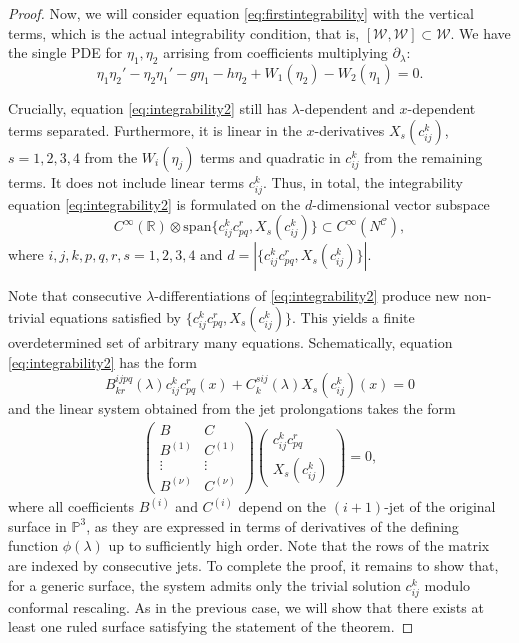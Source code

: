 \documentclass[11pt]{amsart}
\theoremstyle{definition}
\newcommand{\R}{\mathbb{R}}
\newcommand{\PP}{\mathbb{P}}
\newcommand{\spn}{\mathrm{span}}
\newcommand{\WW}{\mathcal{W}}
\begin{document}
\begin{proof}
Now, we will consider equation \eqref{eq:firstintegrability} with the vertical terms, which is the actual integrability condition, that is, $[\WW,\WW]\subset \WW$. We have the single PDE for $\eta_1,\eta_2$ arrising from coefficients multiplying $\partial_\lambda$:
\begin{equation}\label{eq:integrability2}
\eta_1\eta_2'-\eta_2\eta_1'-g\eta_1-h\eta_2+W_1(\eta_2)-W_2(\eta_1)=0.
\end{equation}

Crucially, equation \eqref{eq:integrability2} still has $\lambda$-dependent and $x$-dependent terms separated. Furthermore, it is linear in the $x$-derivatives $X_s(c^k_{ij})$, $s=1,2,3,4$ from the $W_i(\eta_j)$ terms and quadratic in $c^k_{ij}$ from the remaining terms. It does not include linear terms $c^k_{ij}$.  Thus, in total, the integrability equation \eqref{eq:integrability2} is formulated on the $d$-dimensional vector subspace
\[
C^\infty(\R)\otimes\spn\{c^k_{ij}c^r_{pq}, X_s(c^k_{ij})\}\subset C^\infty(N^\mathcal{C}),
\]
where $i,j,k,p,q,r,s=1,2,3,4$ and $d=|\{c^k_{ij}c^r_{pq}, X_s(c^k_{ij})\}|$.

Note that consecutive $\lambda$-differentiations of \eqref{eq:integrability2} produce new non-trivial equations satisfied by $\{c^k_{ij}c^r_{pq}, X_s(c^k_{ij})\}$. This yields a finite overdetermined set of arbitrary many equations. 
Schematically, equation \eqref{eq:integrability2} has the form 
\begin{equation}\label{eq:schematicform}
B_{kr}^{ijpq}(\lambda)c^k_{ij}c^r_{pq}(x)+C^{sij}_{k}(\lambda)X_s(c^k_{ij})(x)=0
\end{equation}
and the linear system obtained from the jet prolongations takes the form
\begin{align}\label{eq:jetprolongedsystem}
\begin{pmatrix}
    B & C\\
    B^{(1)} & C^{(1)}\\
    \vdots & \vdots\\
    B^{(\nu)} & C^{(\nu)}
\end{pmatrix}\begin{pmatrix}
    c^k_{ij}c^r_{pq}\\
    X_s(c^k_{ij})
\end{pmatrix}=0,\end{align}
where all coefficients $B^{(i)}$ and $C^{(i)}$ depend on the $(i+1)$-jet of the original surface in $\PP^3$, as they are expressed in terms of derivatives of the defining function $\phi(\lambda)$ up to sufficiently high order. Note that the rows of the matrix are indexed by consecutive jets. To complete the proof, it remains to show that, for a generic surface, the system admits only the trivial solution $c^k_{ij}$ modulo conformal rescaling. As in the previous case, we will show that there exists at least one ruled surface satisfying the statement of the theorem.



\end{proof}
\end{document}
